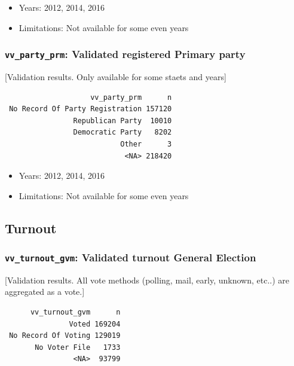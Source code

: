 \documentclass[10pt,article,oneside]{memoir}
\theoremstyle{definition}
\begin{document}
\begin{itemize}
\tightlist
\item
  Years: 2012, 2014, 2016
\item
  Limitations: Not available for some even years
\end{itemize}

\hypertarget{vv_party_prm-validated-registered-primary-party}{%
\subsubsection{\texorpdfstring{\texttt{vv\_party\_prm}: Validated
registered Primary
party}{vv\_party\_prm: Validated registered Primary party}}\label{vv_party_prm-validated-registered-primary-party}}

{[}Validation results. Only available for some staets and years{]}

\begin{verbatim}
                    vv_party_prm      n
 No Record Of Party Registration 157120
                Republican Party  10010
                Democratic Party   8202
                           Other      3
                            <NA> 218420
\end{verbatim}

\begin{itemize}
\tightlist
\item
  Years: 2012, 2014, 2016
\item
  Limitations: Not available for some even years
\end{itemize}

\hypertarget{turnout}{%
\subsection{Turnout}\label{turnout}}

\hypertarget{vv_turnout_gvm-validated-turnout-general-election}{%
\subsubsection{\texorpdfstring{\texttt{vv\_turnout\_gvm}: Validated
turnout General
Election}{vv\_turnout\_gvm: Validated turnout General Election}}\label{vv_turnout_gvm-validated-turnout-general-election}}

{[}Validation results. All vote methods (polling, mail, early, unknown,
etc..) are aggregated as a vote.{]}

\begin{verbatim}
      vv_turnout_gvm      n
               Voted 169204
 No Record Of Voting 129019
       No Voter File   1733
                <NA>  93799
\end{verbatim}
\end{document}
